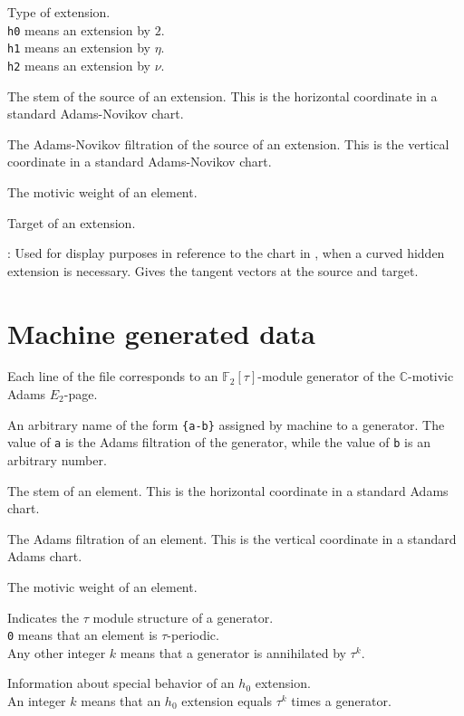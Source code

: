 \documentclass{amsart}
\newcommand{\F}		    {\mathbb{F}}
\newcommand{\C}         {\mathbb{C}}
\begin{document}
 Type of extension. \\
\texttt{h0} means an extension by $2$. \\
\texttt{h1} means an extension by $\eta$. \\
\texttt{h2} means an extension by $\nu$.

 The stem of the source of an extension.  This is the
horizontal coordinate in a standard Adams-Novikov chart.

 The Adams-Novikov filtration of 
the source of an extension.  This is the vertical coordinate in a standard 
Adams-Novikov chart.

 The motivic weight of an element.

 Target of an extension.

:
Used for display purposes in reference to the chart in \cite{IWX19a},
when a curved hidden extension is necessary.
Gives the tangent vectors at the source and target.

\newpage

\section{Machine generated data}

Each line of the file corresponds to an $\F_2[\tau]$-module generator
of the $\C$-motivic Adams $E_2$-page.

An arbitrary name of the form 
\texttt{\{a-b\}}
assigned by machine to a generator.
The value of \texttt{a} is the Adams filtration of the generator,
while the value of \texttt{b} is an arbitrary number.

 The stem of an element.  This is the horizontal coordinate
in a standard Adams chart.

 The Adams filtration of 
an element.  This is the vertical coordinate in a standard 
Adams chart.

 The motivic weight of an element.

 Indicates the $\tau$ module structure of a
generator. \\
\texttt{0} means that an element is $\tau$-periodic. \\
Any other integer $k$ means that a generator is annihilated by $\tau^k$.

Information about special behavior of an $h_0$ extension. \\
An integer $k$ means that an $h_0$ extension
equals $\tau^k$ times a generator.
\end{document}
